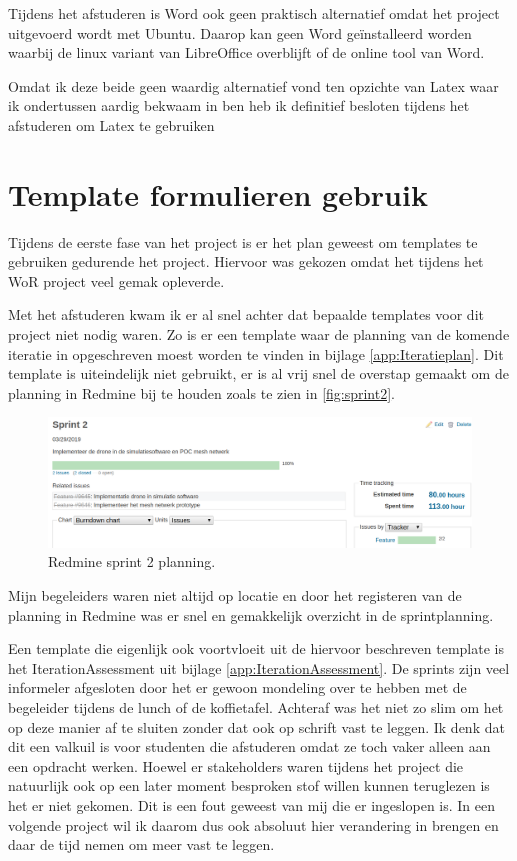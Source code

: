 \documentclass[a4paper, 11pt, oneside]{report}
\begin{document}
Tijdens het afstuderen is Word ook geen praktisch alternatief omdat het project uitgevoerd wordt met Ubuntu. 
Daarop kan geen Word geïnstalleerd worden waarbij de linux variant van LibreOffice overblijft of de online tool van Word.

Omdat ik deze beide geen waardig alternatief vond ten opzichte van Latex waar ik ondertussen aardig bekwaam in ben heb ik definitief besloten tijdens het afstuderen om Latex te gebruiken

\section{Template formulieren gebruik}

Tijdens de eerste fase van het project is er het plan geweest om templates te gebruiken gedurende het project.
Hiervoor was gekozen omdat het tijdens het WoR project veel gemak opleverde. 

Met het afstuderen kwam ik er al snel achter dat bepaalde templates voor dit project niet nodig waren.
Zo is er een template waar de planning van de komende iteratie in opgeschreven moest worden te vinden in bijlage \ref{app:Iteratieplan}.
Dit template is uiteindelijk niet gebruikt, er is al vrij snel de overstap gemaakt om de planning in Redmine bij te houden zoals te zien in \autoref{fig:sprint2}.

\begin{figure}[H]
	\begin{center}\includegraphics[width=1\linewidth]{Afbeeldingen/sprint2.png}\end{center}
	\caption{Redmine sprint 2 planning.}
	\label{fig:sprint2}
\end{figure}

Mijn begeleiders waren niet altijd op locatie en door het registeren van de planning in Redmine was er snel en gemakkelijk overzicht in de sprintplanning.

Een template die eigenlijk ook voortvloeit uit de hiervoor beschreven template is het IterationAssessment uit bijlage \ref{app:IterationAssessment}.
De sprints zijn veel informeler afgesloten door het er gewoon mondeling over te hebben met de begeleider tijdens de lunch of de koffietafel.
Achteraf was het niet zo slim om het op deze manier af te sluiten zonder dat ook op schrift vast te leggen.
Ik denk dat dit een valkuil is voor studenten die afstuderen omdat ze toch vaker alleen aan een opdracht werken.
Hoewel er stakeholders waren tijdens het project die natuurlijk ook op een later moment besproken stof willen kunnen teruglezen is het er niet gekomen.
Dit is een fout geweest van mij die er ingeslopen is.
In een volgende project wil ik daarom dus ook absoluut hier verandering in brengen en daar de tijd nemen om meer vast te leggen.   
\end{document}
